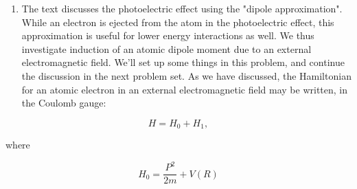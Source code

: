 \documentclass[12pt]{article}
\begin{document}
\begin{enumerate}
\subsection{}
First, we want to check the condition of $\frac{p_fa_0}{\hbar}$ for a kinetic energy of $10 \text{Ry}$, where $a_0$ is the Bohr radius. We have:
\begin{lstlisting}[language=Python]
from sympy import *
# estimate the value of $\frac{p_fa_0}{\hbar}$ for a kinetic energy of $10 \text{Ry}$ in a hydrogen atom
# were $p_f$ is the momentum of the electron and $a_0$ is the Bohr radius
p_f, a_0, hbar = symbols('p_f a_0 hbar')
p_f = sqrt(2*10*13.6)
a_0 = 0.529e-10
hbar = 1.054e-34
print(latex(p_f*a_0/hbar))
\end{lstlisting}
giving the result:
\begin{equation}
  \frac{p_f a_0}{\hbar} = 8.27750617059485 \cdot 10^{24}
\end{equation}
which is much greater than 1. So, we can use the approximation for the differential cross section given in the text:
\begin{equation}
  \frac{d\sigma}{d\Omega} = \frac{32e^2\hbar^5\cos^2\theta}{mc\omega p_f^5a_0^5}
\end{equation}
We bring the solid angle over to the other side, bring the constance out in front and integrate:
\begin{equation}
  \sigma = \frac{64\pi e^2\hbar^5}{mc\omega p_f^5a_0^5} \int_0^{\pi} \cos^2\theta \sin\theta d\theta
\end{equation}
\section{}
  \item The text discusses the photoelectric effect using the "dipole approximation". While an electron is ejected from the atom in the photoelectric effect, this approximation is useful for lower energy interactions as well. We thus investigate induction of an atomic dipole moment due to an external electromagnetic field. We'll set up some things in this problem, and continue the discussion in the next problem set. As we have discussed, the Hamiltonian for an atomic electron in an external electromagnetic field may be written, in the Coulomb gauge:

\end{enumerate}
$$
H=H_{0}+H_{1},
$$

where

$$
H_{0}=\frac{P^{2}}{2 m}+V(R)
$$
\end{document}
